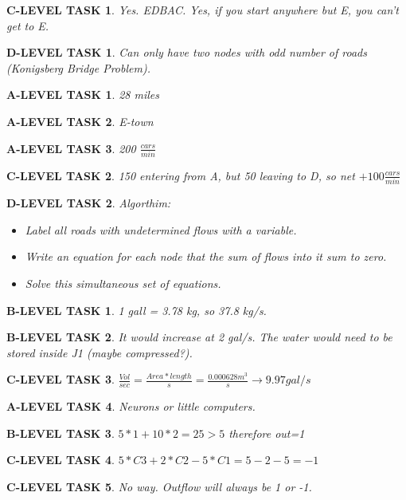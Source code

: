 \documentclass{book}
\numberwithin{equation}{section}
\newtheorem{alevel}{A-LEVEL TASK}
\newtheorem{blevel}{B-LEVEL TASK}
\newtheorem{clevel}{C-LEVEL TASK}
\newtheorem{dlevel}{D-LEVEL TASK}
\theoremstyle{definition}
\begin{document}
\begin{clevel}Yes. EDBAC. Yes, if you start anywhere but E, you can't get to E.\end{clevel}

\begin{dlevel} Can only have two nodes with odd number of roads (Konigsberg Bridge Problem).\end{dlevel}

\begin{alevel}28 miles\end{alevel}

\begin{alevel}E-town\end{alevel}

\begin{alevel}200 $\frac{cars}{min}$\end{alevel}

\begin{clevel}150 entering from A, but 50 leaving to D, so net $+100\frac{cars}{min}$\end{clevel}

\begin{dlevel} Algorthim:\par
\begin{itemize}
\item Label all roads with undetermined flows with a variable.
\item Write an equation for each node that the sum of flows into it sum to zero.
\item Solve this simultaneous set of equations.
\end{itemize}
\end{dlevel}

\begin{blevel}1 gall = 3.78 kg, so 37.8 kg/s.\end{blevel}

\begin{blevel}It would increase at 2 gal/s. The water would need to be stored inside J1 (maybe compressed?).\end{blevel}

\begin{clevel}$\frac{Vol}{sec}=\frac{Area*length}{s}=\frac{0.000628m^3}{s} \rightarrow 9.97 gal/s$\end{clevel}

\begin{alevel}Neurons or little computers.\end{alevel}
\begin{blevel}$5*1+10*2=25 > 5$ therefore out=1\end{blevel}
\begin{clevel}$5*C3+2*C2-5*C1=5-2-5=-1$\end{clevel}
\begin{clevel}No way. Outflow will always be 1 or -1.\end{clevel}
\end{document}
